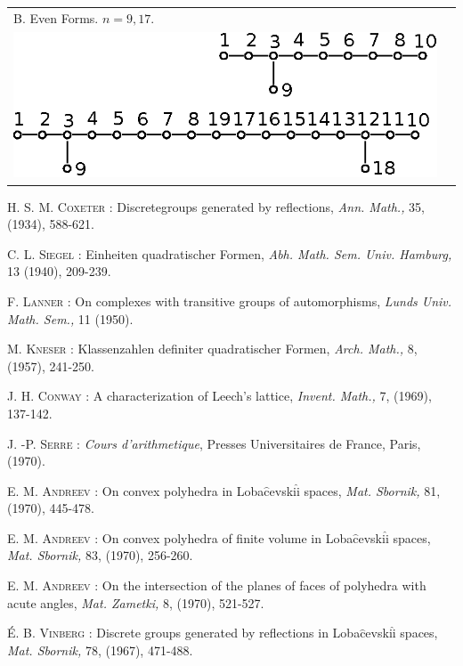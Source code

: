 \begin{landscape}
{\begin{longtable}{@{}ll@{}}
B. Even Forms. $n = 9 , 17$.& \\
{\includegraphics[scale=0.85]{347b.eps}} & \\
\end{longtable}}
\end{landscape}\relax

\begin{thebibliography}{99}
 \textsc{H. S. M. Coxeter :} Discrete\pageoriginale groups generated by reflections, \textit{Ann. Math.,} 35, (1934), 588-621.

 \textsc{C. L. Siegel :} Einheiten quadratischer Formen, \textit{Abh. Math. Sem. Univ. Hamburg,} 13 (1940), 209-239.

 \textsc{F. Lanner :} On complexes with transitive groups of automorphisms, \textit{Lunds Univ. Math. Sem.,} 11 (1950).

 \textsc{M. Kneser :} Klassenzahlen definiter quadratischer Formen, \textit{Arch. Math.,} 8, (1957), 241-250.

 \textsc{J. H. Conway :} A characterization of Leech's lattice, \textit{Invent. Math., } 7, (1969), 137-142.

 \textsc{J. -P. Serre :} \textit{Cours d'arithmetique}, Presses Universitaires de France, Paris, (1970).

 \textsc{E. M. Andreev :} On convex polyhedra in Loba$\hat{\text{c}}$evski$\hat{\text{i}}$ spaces, \textit{Mat. Sbornik,} 81, (1970), 445-478.

 \textsc{E. M. Andreev :} On convex polyhedra of finite volume in Loba$\hat{\text{c}}$evski$\hat{\text{i}}$ spaces, \textit{Mat. Sbornik,} 83, (1970), 256-260.

 \textsc{E. M. Andreev :} On the intersection of the planes of faces of polyhedra with acute angles, \textit{Mat. Zametki,} 8, (1970), 521-527.

 \textsc{\'E. B. Vinberg :} Discrete groups generated by reflections in Loba$\hat{\text{c}}$evski$\hat{\text{i}}$ spaces, \textit{Mat. Sbornik,} 78, (1967), 471-488.


\end{thebibliography}
